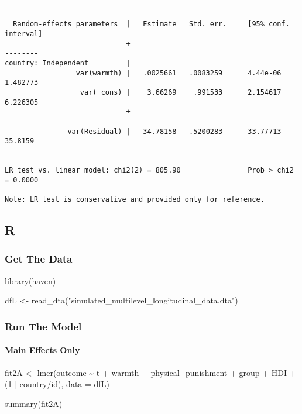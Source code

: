 \documentclass[
  letterpaper,
  DIV=11,
  numbers=noendperiod]{scrreprt}
\let\oldparagraph\paragraph
\renewcommand{\paragraph}[1]{\oldparagraph{#1}\mbox{}}
\newenvironment{Shaded}{\begin{snugshade}}{\end{snugshade}}
\newcommand{\AttributeTok}[1]{\textcolor[rgb]{0.40,0.45,0.13}{#1}}
\newcommand{\DecValTok}[1]{\textcolor[rgb]{0.68,0.00,0.00}{#1}}
\newcommand{\FunctionTok}[1]{\textcolor[rgb]{0.28,0.35,0.67}{#1}}
\newcommand{\NormalTok}[1]{\textcolor[rgb]{0.00,0.23,0.31}{#1}}
\newcommand{\OtherTok}[1]{\textcolor[rgb]{0.00,0.23,0.31}{#1}}
\newcommand{\SpecialCharTok}[1]{\textcolor[rgb]{0.37,0.37,0.37}{#1}}
\newcommand{\StringTok}[1]{\textcolor[rgb]{0.13,0.47,0.30}{#1}}
\begin{document}
\begin{verbatim}
------------------------------------------------------------------------------
  Random-effects parameters  |   Estimate   Std. err.     [95% conf. interval]
-----------------------------+------------------------------------------------
country: Independent         |
                 var(warmth) |   .0025661   .0083259      4.44e-06    1.482773
                  var(_cons) |    3.66269    .991533      2.154617    6.226305
-----------------------------+------------------------------------------------
               var(Residual) |   34.78158   .5200283      33.77713     35.8159
------------------------------------------------------------------------------
LR test vs. linear model: chi2(2) = 805.90                Prob > chi2 = 0.0000

Note: LR test is conservative and provided only for reference.
\end{verbatim}

\subsection{R}

\subsubsection{Get The Data}\label{get-the-data-4}

\begin{Shaded}
\begin{Highlighting}[]
\FunctionTok{library}\NormalTok{(haven)}

\NormalTok{dfL }\OtherTok{\textless{}{-}} \FunctionTok{read\_dta}\NormalTok{(}\StringTok{"simulated\_multilevel\_longitudinal\_data.dta"}\NormalTok{)}
\end{Highlighting}
\end{Shaded}

\subsubsection{Run The Model}\label{run-the-model-4}

\paragraph{Main Effects Only}\label{main-effects-only-1}

\begin{Shaded}
\begin{Highlighting}[]
\NormalTok{fit2A }\OtherTok{\textless{}{-}} \FunctionTok{lmer}\NormalTok{(outcome }\SpecialCharTok{\textasciitilde{}}\NormalTok{ t }\SpecialCharTok{+}\NormalTok{ warmth }\SpecialCharTok{+}\NormalTok{ physical\_punishment }\SpecialCharTok{+} 
\NormalTok{               group }\SpecialCharTok{+}\NormalTok{ HDI }\SpecialCharTok{+}
\NormalTok{               (}\DecValTok{1} \SpecialCharTok{|}\NormalTok{ country}\SpecialCharTok{/}\NormalTok{id),}
             \AttributeTok{data =}\NormalTok{ dfL)}

\FunctionTok{summary}\NormalTok{(fit2A)}
\end{Highlighting}
\end{Shaded}
\end{document}
